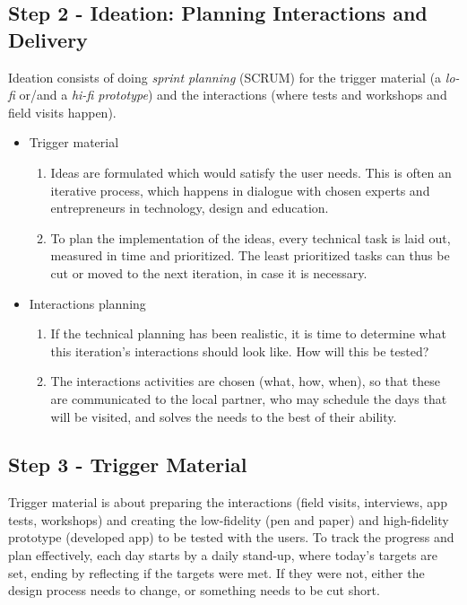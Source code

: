 \subsection{Step 2 - Ideation: Planning Interactions and Delivery}
  Ideation consists of doing \textit{sprint planning} (SCRUM) for the trigger material (a \textit{lo-fi} or/and a \textit{hi-fi prototype}) and the interactions (where tests and workshops and field visits happen).

    \begin{itemize}
    \item Trigger material
      \begin{enumerate}
      \item Ideas are formulated which would satisfy the user needs. This is often an iterative process, which happens in dialogue with chosen experts and entrepreneurs in technology, design and education.
      \item To plan the implementation of the ideas, every technical task is laid out, measured in time and prioritized. The least prioritized tasks can thus be cut or moved to the next iteration, in case it is necessary.
      \end{enumerate}
    \item Interactions planning
      \begin{enumerate}
      \item If the technical planning has been realistic, it is time to determine what this iteration's interactions should look like. How will this be tested?
      \item The interactions activities are chosen (what, how, when), so that these are communicated to the local partner, who may schedule the days that will be visited, and solves the needs to the best of their ability.
      \end{enumerate}
    \end{itemize}

  \subsection{Step 3 - Trigger Material}
  Trigger material is about preparing the interactions (field visits, interviews, app tests, workshops) and creating the low-fidelity (pen and paper) and high-fidelity prototype (developed app) to be tested with the users. To track the progress and plan effectively, each day starts by a daily stand-up, where today's targets are set, ending by reflecting if the targets were met. If they were not, either the design process needs to change, or something needs to be cut short.

